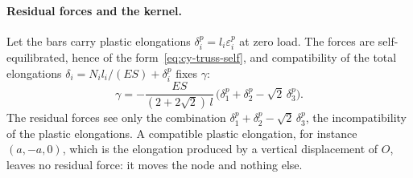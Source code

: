 \paragraph{Residual forces and the kernel.}
%
Let the bars carry plastic elongations $\delta^p_i=l_i\varepsilon^p_i$ at zero
load. The forces are self-equilibrated, hence of the
form~\eqref{eq:cy-truss-self}, and compatibility of the total elongations
$\delta_i=N_il_i/(ES)+\delta^p_i$ fixes $\gamma$:
\begin{equation}\label{eq:cy-truss-res}
  \gamma=-\frac{ES}{(2+2\sqrt2)\,l}\,\bigl(\delta^p_1+\delta^p_2-\sqrt2\,\delta^p_3\bigr).
\end{equation}
The residual forces see only the combination
$\delta^p_1+\delta^p_2-\sqrt2\,\delta^p_3$, the incompatibility of the plastic
elongations. A compatible plastic elongation, for instance $(a,-a,0)$, which
is the elongation produced by a vertical displacement of $O$, leaves no
residual force: it moves the node and nothing else.

